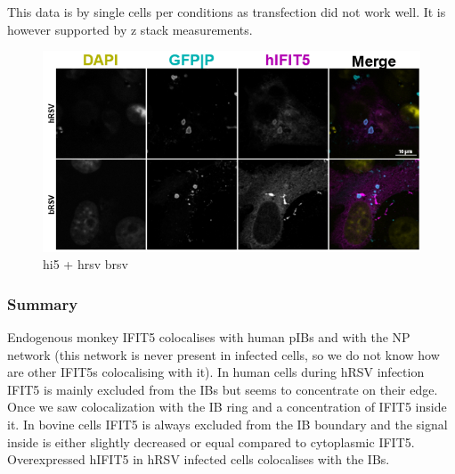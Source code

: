 This data is by single cells per conditions as transfection did not work well. It is however supported by z stack measurements.


\begin{figure}
    \centering
    \includegraphics[width=1\linewidth]{09. Chapter 4/Figs/05. IFIT5/05. hi5-hrsv-brsv.png}
    \caption[hi5 + hrsv brsv]{hi5 + hrsv brsv}
    \label{fig:hi5 + hrsv brsv}
\end{figure}

\subsubsection{Summary} \label{Summary-i5}
Endogenous monkey IFIT5 colocalises with human pIBs and with the NP network (this network is never present in infected cells, so we do not know how are other IFIT5s colocalising with it). In human cells during hRSV infection IFIT5 is mainly excluded from the IBs but seems to concentrate on their edge. Once we saw colocalization with the IB ring and a concentration of IFIT5 inside it. In bovine cells IFIT5 is always excluded from the IB boundary and the signal inside is either slightly decreased or equal compared to cytoplasmic IFIT5. Overexpressed hIFIT5 in hRSV infected cells colocalises with the IBs.